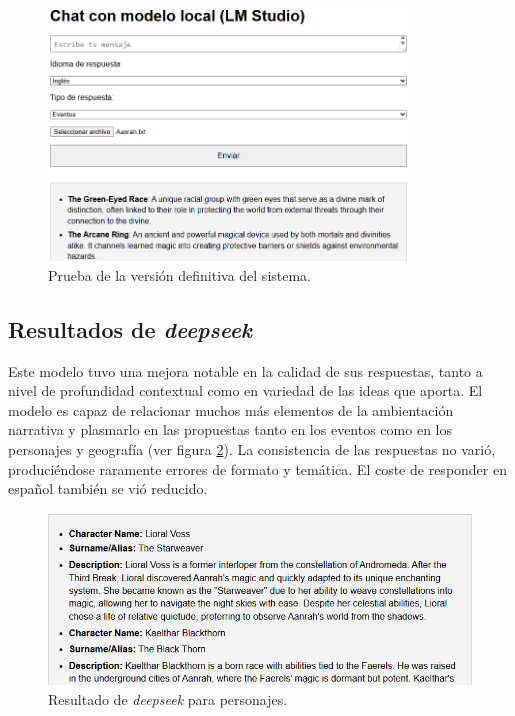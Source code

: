 \begin{figure}[htbp]
	\centering
	\includegraphics[width=0.85\textwidth]{./Figures/full-promp-testing.png}
	\caption{Prueba de la versión definitiva del sistema.}
	\label{fig:full-prompt-test}
\end{figure}

\subsection{Resultados de \textit{deepseek}}
Este modelo tuvo una mejora notable en la calidad de sus respuestas, tanto a nivel de profundidad
contextual como en variedad de las ideas que aporta.
El modelo es capaz de relacionar muchos más elementos de la ambientación narrativa y
plasmarlo en las propuestas tanto en los eventos como en los personajes y geografía
(ver figura \ref{fig:deepseek-prompt-char}).
La consistencia de las respuestas no varió,
produciéndose raramente errores de formato y temática.
El coste de responder en español también se vió reducido.

\begin{figure}[htbp]
	\centering
	\includegraphics[width=1\textwidth]{./Figures/deepseek-prompt-characters.png}
	\caption{Resultado de \textit{deepseek} para personajes.}
	\label{fig:deepseek-prompt-char}
\end{figure}
\pagebreak
